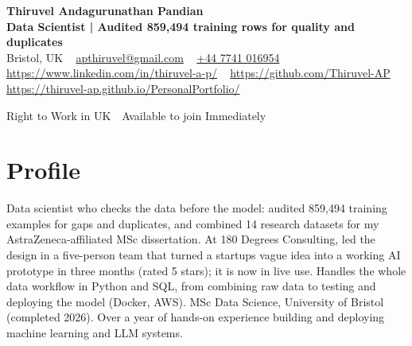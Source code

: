\documentclass[a4paper,11pt]{article}
\newcommand{\num}[1]{\textbf{#1}}   %
\begin{document}
\begin{center}
  {\LARGE\bfseries Thiruvel Andagurunathan Pandian} \\[3pt]
  {\color{headernavy}\small\textbf{Data Scientist | Audited \num{859,494} training rows for quality and duplicates}} \\[3pt]
  {\small
  Bristol, UK\nobreak\ \,\textbar\, \href{mailto:apthiruvel@gmail.com}{apthiruvel@gmail.com}\nobreak\ \,\textbar\, \href{tel:+447741016954}{+44 7741 016954}\nobreak\ \,\textbar\, \href{https://www.linkedin.com/in/thiruvel-a-p/}{https://www.linkedin.com/in/thiruvel-a-p/}\nobreak\ \,\textbar\, \href{https://github.com/Thiruvel-AP}{https://github.com/Thiruvel-AP}\nobreak\ \,\textbar\, \href{https://thiruvel-ap.github.io/PersonalPortfolio/}{https://thiruvel-ap.github.io/PersonalPortfolio/}}\par\vspace{4pt}
  \noindent{} Right to Work in UK \,\textbar\, Available to join Immediately
\end{center}

\section{Profile}
Data scientist who checks the data before the model: audited 859,494 training examples for gaps and duplicates, and combined 14 research datasets for my AstraZeneca-affiliated MSc dissertation. At 180 Degrees Consulting, led the design in a five-person team that turned a startup\textquotesingle{}s vague idea into a working AI prototype in three months (rated 5 stars); it is now in live use. Handles the whole data workflow in Python and SQL, from combining raw data to testing and deploying the model (Docker, AWS). MSc Data Science, University of Bristol (completed 2026). Over a year of hands-on experience building and deploying machine learning and LLM systems.
\end{document}
